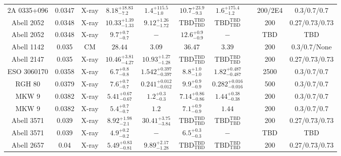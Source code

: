 \begin{table}
\begin{tabular}{cccccccccc}
2A 0335+096 & 0.0347 & X-ray & ${8.18}^{+18.83}_{-7.2}$ & ${1.4}^{+115.5}_{-1.0}$ & ${10.7}^{+23.9}_{-9.3}$ & ${1.6}^{+175.4}_{-1.2}$ & \citet{VO06.1} & 200/2E4 & 0.3/0.7/0.7 \\
Abell 2052 & 0.0348 & X-ray & ${10.33}^{+1.39}_{-1.33}$ & ${9.12}^{+1.26}_{-1.72}$ & ${\mathrm{TBD}}^{\mathrm{TBD}}_{\mathrm{TBD}}$ & ${\mathrm{TBD}}^{\mathrm{TBD}}_{\mathrm{TBD}}$ & \citet{BA14.1} & 200 & 0.27/0.73/0.73 \\
Abell 2052 & 0.0348 & X-ray & ${9.7}^{+0.7}_{-0.7}$ & ${-}^{}_{}$ & ${12.6}^{+0.9}_{-0.9}$ & ${-}^{}_{}$ & \citet{XU01.1} & TBD & TBD \\
Abell 1142 & 0.035 & CM & ${28.44}^{}_{}$ & ${3.09}^{}_{}$ & ${36.47}^{}_{}$ & ${3.39}^{}_{}$ & \citet{RI06.1} & 200 & 0.3/0.7/None \\
Abell 2147 & 0.035 & X-ray & ${10.46}^{+3.81}_{-4.27}$ & ${10.93}^{+1.27}_{-1.28}$ & ${\mathrm{TBD}}^{\mathrm{TBD}}_{\mathrm{TBD}}$ & ${\mathrm{TBD}}^{\mathrm{TBD}}_{\mathrm{TBD}}$ & \citet{BA14.1} & 200 & 0.27/0.73/0.73 \\
ESO 3060170 & 0.0358 & X-ray & ${6.7}^{+0.8}_{-0.8}$ & ${1.542}^{+0.397}_{-0.397}$ & ${8.8}^{+1.0}_{-1.0}$ & ${1.82}^{+0.487}_{-0.487}$ & \citet{GA06.1} & 2500 & 0.3/0.7/0.7 \\
RGH 80 & 0.0379 & X-ray & ${7.6}^{+0.7}_{-0.7}$ & ${0.241}^{+0.012}_{-0.012}$ & ${9.9}^{+0.9}_{-0.9}$ & ${0.282}^{+0.016}_{-0.016}$ & \citet{GA06.1} & 500 & 0.3/0.7/0.7 \\
MKW 9 & 0.0382 & X-ray & ${5.41}^{+0.67}_{-0.67}$ & ${1.2}^{+0.3}_{-0.3}$ & ${7.14}^{+0.86}_{-0.86}$ & ${1.44}^{+0.38}_{-0.38}$ & \citet{PO05.1} & 200 & 0.3/0.7/0.7 \\
MKW 9 & 0.0382 & X-ray & ${5.4}^{+0.7}_{-0.7}$ & ${1.2}^{}_{}$ & ${7.1}^{+0.9}_{-0.9}$ & ${1.44}^{}_{}$ & \citet{PR05.1} & 200 & 0.3/0.7/0.7 \\
Abell 3571 & 0.039 & X-ray & ${8.92}^{+1.98}_{-2.1}$ & ${30.41}^{+3.75}_{-3.84}$ & ${\mathrm{TBD}}^{\mathrm{TBD}}_{\mathrm{TBD}}$ & ${\mathrm{TBD}}^{\mathrm{TBD}}_{\mathrm{TBD}}$ & \citet{BA14.1} & 200 & 0.27/0.73/0.73 \\
Abell 3571 & 0.039 & X-ray & ${4.9}^{+0.2}_{-0.2}$ & ${-}^{}_{}$ & ${6.5}^{+0.3}_{-0.3}$ & ${-}^{}_{}$ & \citet{XU01.1} & TBD & TBD \\
Abell 2657 & 0.04 & X-ray & ${5.49}^{+0.83}_{-0.81}$ & ${9.89}^{+2.17}_{-1.28}$ & ${\mathrm{TBD}}^{\mathrm{TBD}}_{\mathrm{TBD}}$ & ${\mathrm{TBD}}^{\mathrm{TBD}}_{\mathrm{TBD}}$ & \citet{BA14.1} & 200 & 0.27/0.73/0.73 \\

\end{tabular}
\end{table}
